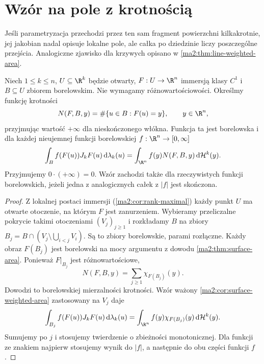 \section{Wzór na pole z krotnością}

Jeśli parametryzacja przechodzi przez ten sam fragment
powierzchni kilkakrotnie, jej jakobian nadal opisuje
lokalne pole, ale całka po dziedzinie liczy
poszczególne przejścia. Analogiczne zjawisko
dla krzywych opisano w
\ref{ma2:thm:line-weighted-area}.

\begin{twierdzenie}
\label{ma2:thm:surface-multiplicity}
Niech $1\le k\le n$, $U\subseteq\R^k$ będzie otwarty,
$F:U\to\R^n$ immersją klasy $C^1$ i $B\subseteq U$
zbiorem borelowskim. Nie wymagamy różnowartościowości.
Określmy funkcję krotności
\[
 N(F,B,y)=\#\{u\in B:F(u)=y\},
 \qquad y\in\R^n,
\]
przyjmując wartość $+\infty$ dla nieskończonego włókna.
Funkcja ta jest borelowska i dla każdej nieujemnej
funkcji borelowskiej $f:\R^n\to[0,\infty]$
\[
 \int_B f(F(u))J_kF(u)\,\mathrm d\lambda_k(u)
 =\int_{\R^n} f(y)N(F,B,y)\,\mathrm d\mathcal H^k(y).
\]
Przyjmujemy $0\cdot(+\infty)=0$.
Wzór zachodzi także dla rzeczywistych funkcji
borelowskich, jeżeli jedna z analogicznych całek
z $|f|$ jest skończona.
\end{twierdzenie}
\begin{proof}
Z lokalnej postaci immersji
(\ref{ma2:cor:rank-maximal}) każdy punkt $U$
ma otwarte otoczenie, na którym $F$ jest zanurzeniem.
Wybieramy przeliczalne pokrycie takimi otoczeniami
$(V_j)_{j\ge1}$ i rozkładamy $B$ na zbiory
$B_j=B\cap(V_j\setminus\bigcup_{i<j}V_i)$.
Są to zbiory borelowskie, parami rozłączne.
Każdy obraz $F(B_j)$ jest borelowski na mocy
argumentu z dowodu \ref{ma2:thm:surface-area}.
Ponieważ $F|_{B_j}$ jest różnowartościowe,
\[
 N(F,B,y)=\sum_{j\ge1}\chi_{F(B_j)}(y).
\]
Dowodzi to borelowskiej mierzalności krotności.
Wzór ważony \ref{ma2:cor:surface-weighted-area}
zastosowany na $V_j$ daje
\[
 \int_{B_j} f(F(u))J_kF(u)\,\mathrm d\lambda_k(u)
 =\int_{\R^n} f(y)\chi_{F(B_j)}(y)\,
 \mathrm d\mathcal H^k(y).
\]
Sumujemy po $j$ i stosujemy twierdzenie
o zbieżności monotonicznej.
Dla funkcji ze znakiem najpierw stosujemy
wynik do $|f|$, a następnie do obu części
funkcji $f$.
\end{proof}

